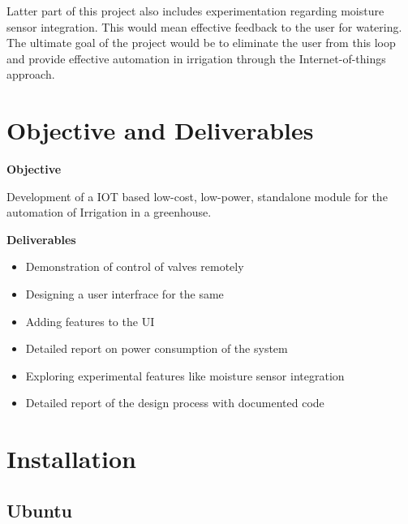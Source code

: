 \documentclass[16pt]{article}
\begin{document}
 Latter part of this project also includes experimentation regarding moisture sensor integration. This would mean effective feedback to the user for 
 watering. The ultimate goal of the project would be to eliminate the user from this loop and provide effective automation in irrigation through the 
 Internet-of-things approach.


\vspace{12cm}



\section{Objective and Deliverables} 

\vspace{1cm}
  {\Large{\textbf{Objective}}} \\
  
  \vspace{0.1cm}
  
  Development of a IOT based low-cost, low-power, standalone module for the automation of Irrigation in a greenhouse.
  
   \vspace{0.6cm}
   
  {\textbf{Deliverables}}
  
\begin{itemize}
\item Demonstration of control of valves remotely
\item Designing a user interfrace for the same 
\item Adding features to the UI 
\item Detailed report on power consumption of the system
\item Exploring experimental features like moisture sensor integration
\item Detailed report of the design process with documented code
\end{itemize}

\vspace{8cm}

\section{Installation}
 
\vspace{1cm}                                    %


 
\subsection{Ubuntu}
\end{document}
